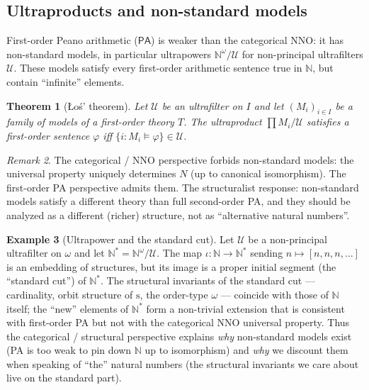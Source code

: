 \documentclass[12pt]{article}
\newtheorem{theorem}{Theorem}[section]
\theoremstyle{definition}
\newtheorem{example}[theorem]{Example}
\theoremstyle{remark}
\newtheorem{remark}[theorem]{Remark}
\newcommand{\NN}{\mathbb{N}}
\newcommand{\succop}{\mathrm{s}}
\begin{document}
\subsection{Ultraproducts and non-standard models}

First-order Peano arithmetic ($\mathsf{PA}$) is weaker than the categorical NNO: it has non-standard models, in particular ultrapowers $\NN^{\omega}/\mathcal{U}$ for non-principal ultrafilters $\mathcal{U}$. These models satisfy every first-order arithmetic sentence true in $\NN$, but contain ``infinite'' elements.

\begin{theorem}[\L{}o\'s' theorem]
Let $\mathcal{U}$ be an ultrafilter on $I$ and let $(M_i)_{i \in I}$ be a family of models of a first-order theory $T$. The ultraproduct $\prod M_i / \mathcal{U}$ satisfies a first-order sentence $\varphi$ iff $\{i : M_i \models \varphi\} \in \mathcal{U}$.
\end{theorem}

\begin{remark}
The categorical / NNO perspective forbids non-standard models: the universal property uniquely determines $N$ (up to canonical isomorphism). The first-order PA perspective admits them. The structuralist response: non-standard models satisfy a different theory than full second-order PA, and they should be analyzed as a different (richer) structure, not as ``alternative natural numbers''.
\end{remark}

\begin{example}[Ultrapower and the standard cut]
Let $\mathcal{U}$ be a non-principal ultrafilter on $\omega$ and let $\NN^* = \NN^\omega/\mathcal{U}$. The map $\iota : \NN \to \NN^*$ sending $n \mapsto [n, n, n, \dots]$ is an embedding of structures, but its image is a proper initial segment (the ``standard cut'') of $\NN^*$. The structural invariants of the standard cut --- cardinality, orbit structure of $\succop$, the order-type $\omega$ --- coincide with those of $\NN$ itself; the ``new'' elements of $\NN^*$ form a non-trivial extension that is consistent with first-order PA but not with the categorical NNO universal property. Thus the categorical / structural perspective explains \emph{why} non-standard models exist (PA is too weak to pin down $\NN$ up to isomorphism) and \emph{why} we discount them when speaking of ``the'' natural numbers (the structural invariants we care about live on the standard part).
\end{example}
\end{document}
